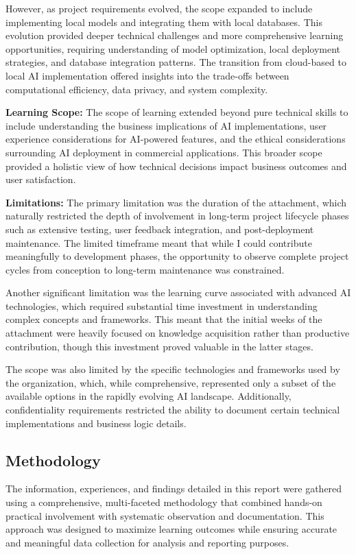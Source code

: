 \documentclass[12pt,a4paper]{article}
\begin{document}
However, as project requirements evolved, the scope expanded to include implementing local models and integrating them with local databases. This evolution provided deeper technical challenges and more comprehensive learning opportunities, requiring understanding of model optimization, local deployment strategies, and database integration patterns. The transition from cloud-based to local AI implementation offered insights into the trade-offs between computational efficiency, data privacy, and system complexity.

\textbf{Learning Scope:} The scope of learning extended beyond pure technical skills to include understanding the business implications of AI implementations, user experience considerations for AI-powered features, and the ethical considerations surrounding AI deployment in commercial applications. This broader scope provided a holistic view of how technical decisions impact business outcomes and user satisfaction.

\textbf{Limitations:} The primary limitation was the duration of the attachment, which naturally restricted the depth of involvement in long-term project lifecycle phases such as extensive testing, user feedback integration, and post-deployment maintenance. The limited timeframe meant that while I could contribute meaningfully to development phases, the opportunity to observe complete project cycles from conception to long-term maintenance was constrained.

Another significant limitation was the learning curve associated with advanced AI technologies, which required substantial time investment in understanding complex concepts and frameworks. This meant that the initial weeks of the attachment were heavily focused on knowledge acquisition rather than productive contribution, though this investment proved valuable in the latter stages.

The scope was also limited by the specific technologies and frameworks used by the organization, which, while comprehensive, represented only a subset of the available options in the rapidly evolving AI landscape. Additionally, confidentiality requirements restricted the ability to document certain technical implementations and business logic details.

\subsection{Methodology}
The information, experiences, and findings detailed in this report were gathered using a comprehensive, multi-faceted methodology that combined hands-on practical involvement with systematic observation and documentation. This approach was designed to maximize learning outcomes while ensuring accurate and meaningful data collection for analysis and reporting purposes.
\end{document}
